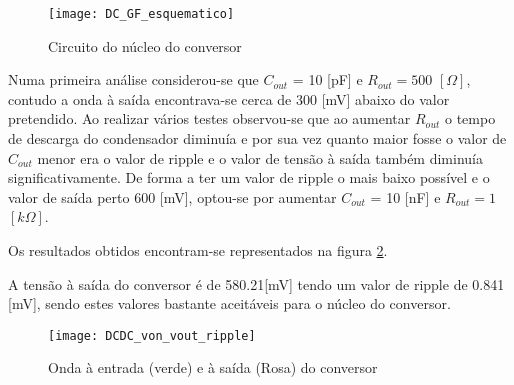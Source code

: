 \documentclass[12pt]{article}
\begin{document}
\begin{figure}[h]
	\centering
	\texttt{[image: DC\_GF\_esquematico]}
	\caption{Circuito do núcleo do conversor}
	\label{fig:DC_GF_esquematico}
\end{figure}
\vspace{5mm}


Numa primeira análise considerou-se que $C_{out}$ = 10 [pF] e $R_{out} = 500$ $[\Omega]$, contudo a onda à saída encontrava-se cerca de 300 [mV] abaixo do valor pretendido. Ao realizar vários testes observou-se que ao aumentar $R_{out}$ o tempo de descarga do condensador diminuía e por sua vez quanto maior fosse o valor de $C_{out}$ menor era o valor de ripple e o valor de tensão à saída também diminuía significativamente. De forma a ter um valor de ripple o mais baixo possível e o valor de saída perto 600 [mV], optou-se por aumentar  $C_{out}$ = 10 [nF] e $R_{out} = 1$ $[k\Omega]$. 

Os resultados obtidos encontram-se representados na figura \ref{fig:onda_saida_com_ripple}.

A tensão à saída do conversor é de 580.21[mV] tendo um valor de ripple de 0.841 [mV], sendo estes valores bastante aceitáveis para o núcleo do conversor.
\break
\break

\begin{figure}[hbtp]
	\centering
	\texttt{[image: DCDC\_von\_vout\_ripple]}
	\caption{Onda à entrada (verde) e à saída (Rosa) do conversor}
	\label{fig:onda_saida_com_ripple} 
\end{figure}  



   

\end{document}
